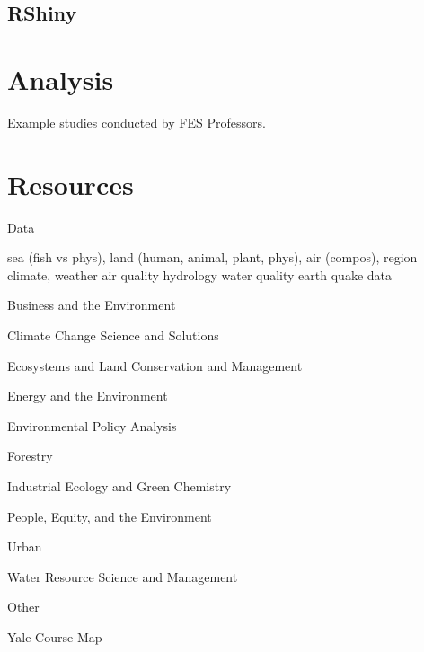 \documentclass[
]{book}
\begin{document}
\hypertarget{rshiny}{%
\section{RShiny}\label{rshiny}}

\hypertarget{analysis}{%
\chapter{Analysis}\label{analysis}}

Example studies conducted by FES Professors.

\hypertarget{resources}{%
\chapter{Resources}\label{resources}}

Data

sea (fish vs phys), land (human, animal, plant, phys), air (compos), region
climate, weather
air quality
hydrology
water quality
earth quake data

Business and the Environment

Climate Change Science and Solutions

Ecosystems and Land Conservation and Management

Energy and the Environment

Environmental Policy Analysis

Forestry

Industrial Ecology and Green Chemistry

People, Equity, and the Environment

Urban

Water Resource Science and Management

Other

Yale Course Map

  
\end{document}
